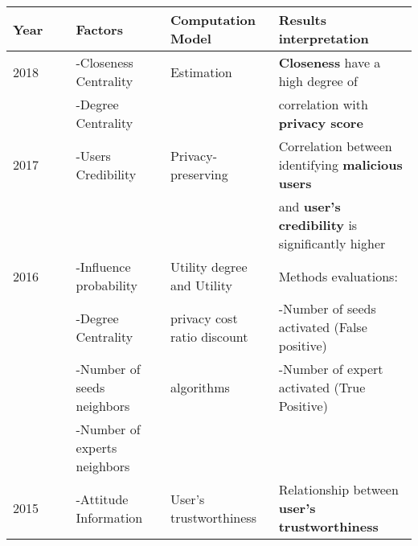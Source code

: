 \onecolumn
\setlength{\hoffset}{-0.5in}

\begin{longtable}{lllll}

	Year  & \                                              & \textbf{Factors}                 & \textbf{Computation Model}       & \textbf{Results interpretation}                               \\\hline
	2018  & \cite{alemany_estimation_2018}                 & -Closeness Centrality            & Estimation                       & \textbf{Closeness} have a high degree of                      \\
	\     &                                                & -Degree Centrality               &                                  & correlation with \textbf{privacy score}                       \\\hline
	2017  & \cite{zhang_privacypreserving_2017}            & -Users Credibility               & Privacy-preserving               & Correlation between identifying \textbf{malicious users}      \\
	\     & \                                              & \                                &                                  & and \textbf{user's credibility} is significantly higher       \\\hline
	2016  & \cite{li_algorithm_2016}                       & -Influence probability           & Utility degree and Utility       & Methods evaluations:                                          \\
	\     & \                                              & -Degree Centrality               & privacy cost ratio discount      & -Number of seeds activated (False positive)                   \\
	\     & \                                              & -Number of seeds neighbors       & algorithms                       & -Number of expert activated (True Positive)                   \\
	\     & \                                              & -Number of experts neighbors     &                                  &                                                               \\\hline
	2015  & \cite{pandey_computing_2015}                   & -Attitude Information            & User’s trustworthiness           & Relationship between \textbf{user’s trustworthiness}          \\

\end{longtable}

